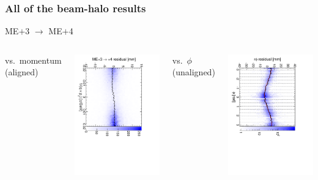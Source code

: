 \documentclass[compress]{beamer}
\begin{document}
\begin{frame}
\frametitle{All of the beam-halo results}

\begin{center}
ME$+$3 $\to$ ME$+$4
\end{center}

\begin{columns}
\centering vs.\ momentum (aligned)

\includegraphics[height=\linewidth, angle=90]{linear_mep3to4.pdf}

\centering vs.\ $\phi$ (unaligned)

\includegraphics[height=\linewidth, angle=90]{diskiter01_p3to4.pdf}


\end{columns}
\end{frame}
\end{document}
